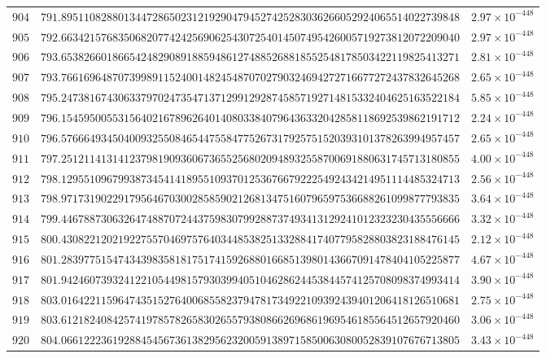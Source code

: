 \documentclass[12pt,reqno]{amsart}
\theoremstyle{remark}
\begin{document}
\begin{longtable}{clc}
$904$ & $791.8951108288013447286502312192904794527425283036266052924065514022739848$ & $2.97\times 10^{-448}$ \\
$905$ & $792.6634215768350682077424256906254307254014507495426005719273812072209040$ & $2.97\times 10^{-448}$ \\
$906$ & $793.6538266018665424829089188594861274885268818552548178503422119825413271$ & $2.81\times 10^{-448}$ \\
$907$ & $793.7661696487073998911524001482454870702790324694272716677272437832645268$ & $2.65\times 10^{-448}$ \\
$908$ & $795.2473816743063379702473547137129912928745857192714815332404625163522184$ & $5.85\times 10^{-448}$ \\
$909$ & $796.1545950055315640216789626401408033840796436332042858118692539862191712$ & $2.24\times 10^{-448}$ \\
$910$ & $796.5766649345040093255084654475584775267317925751520393101378263994957457$ & $2.65\times 10^{-448}$ \\
$911$ & $797.2512114131412379819093606736552568020948932558700691880631745713180855$ & $4.00\times 10^{-448}$ \\
$912$ & $798.1295510967993873454141895510937012536766792225492434214951114485324713$ & $2.56\times 10^{-448}$ \\
$913$ & $798.9717319022917956467030028585902126813475160796597536688261099877793835$ & $3.64\times 10^{-448}$ \\
$914$ & $799.4467887306326474887072443759830799288737493413129241012323230435556666$ & $3.32\times 10^{-448}$ \\
$915$ & $800.4308221202192275570469757640344853825133288417407795828803823188476145$ & $2.12\times 10^{-448}$ \\
$916$ & $801.2839775154743439835818175174159268801668513980143667091478404105225877$ & $4.67\times 10^{-448}$ \\
$917$ & $801.9424607393241221054498157930399405104628624453844574125708098374993414$ & $3.90\times 10^{-448}$ \\
$918$ & $803.0164221159647435152764006855823794781734922109392439401206418126510681$ & $2.75\times 10^{-448}$ \\
$919$ & $803.6121824084257419785782658302655793808662696861969546185564512657920460$ & $3.06\times 10^{-448}$ \\
$920$ & $804.0661222361928845456736138295623200591389715850063080052839107676713805$ & $3.43\times 10^{-448}$ \\

\end{longtable}
\end{document}
